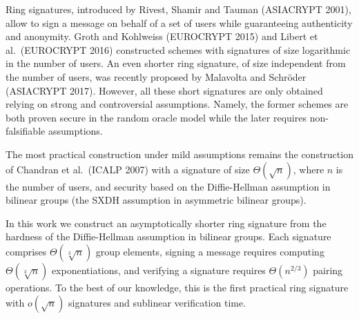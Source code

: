 
Ring signatures, introduced by Rivest, Shamir and Tauman (ASIACRYPT 2001), allow to sign a message on behalf of a set of users while guaranteeing authenticity and anonymity. Groth and Kohlweiss (EUROCRYPT 2015) and Libert et al.~(EUROCRYPT 2016) constructed schemes with signatures of size logarithmic in the number of users. An even shorter ring signature, of size independent from the number of users, was recently proposed by Malavolta and  Schr\"oder (ASIACRYPT 2017).
However, all these short signatures are only obtained relying on strong and controversial assumptions. Namely, the former schemes are both proven secure in the random oracle model while the later requires non-falsifiable assumptions.

The most practical construction under mild assumptions remains the construction of Chandran et al.~(ICALP 2007) with a signature of size $\Theta(\sqrt{n})$, where $n$ is the number of users, and security based on the Diffie-Hellman assumption in bilinear groups (the SXDH assumption in asymmetric bilinear groups).

In this work we construct an asymptotically shorter ring signature from the hardness of the Diffie-Hellman assumption in bilinear groups.
 Each signature comprises $\Theta(\sqrt[3]{n})$ group elements, signing a message requires computing $\Theta(\sqrt[3]{n})$ exponentiations, and verifying a signature requires $\Theta(n^{2/3})$ pairing operations. To the best of our knowledge, this is the first practical ring signature with $o(\sqrt{n})$ signatures and sublinear verification time.
